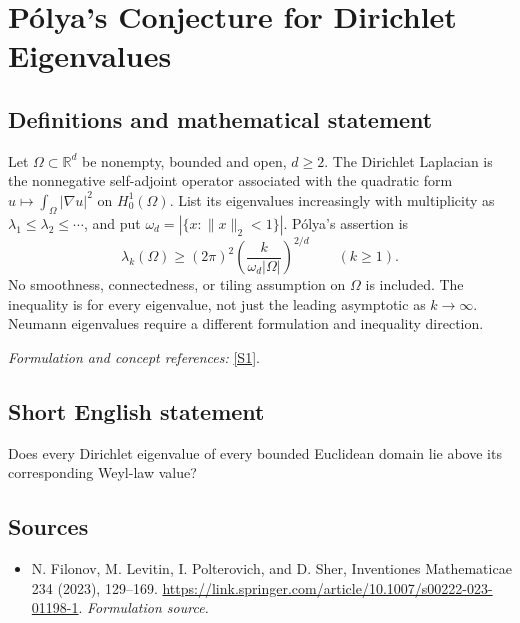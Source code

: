 \documentclass[11pt]{article}
\begin{document}
\section*{\texorpdfstring{Pólya's Conjecture for Dirichlet Eigenvalues}{Pólya's Conjecture for Dirichlet Eigenvalues}}\label{30006908}
\subsection{Definitions and mathematical statement}
Let $\Omega\subset{\mathbb{R}}^d$ be nonempty, bounded and open, $d\ge2$. The Dirichlet Laplacian is the nonnegative self-adjoint operator associated with the quadratic form $u\mapsto\int_\Omega|\nabla u|^2$ on $H_0^1(\Omega)$. List its eigenvalues increasingly with multiplicity as $\lambda_1\le\lambda_2\le\cdots$, and put $\omega_d=|\{x:\|x\|_2<1\}|$. P\'olya's assertion is
\[
 \lambda_k(\Omega)\ge(2\pi)^2
 \left(\frac{k}{\omega_d|\Omega|}\right)^{2/d}
 \qquad(k\ge1).
\]
No smoothness, connectedness, or tiling assumption on $\Omega$ is included. The inequality is for every eigenvalue, not just the leading asymptotic as $k\to\infty$. Neumann eigenvalues require a different formulation and inequality direction.
\par\smallskip\textit{Formulation and concept references:} \href{https://link.springer.com/article/10.1007/s00222-023-01198-1}{[S1]}.

\subsection{Short English statement}
Does every Dirichlet eigenvalue of every bounded Euclidean domain lie above its corresponding Weyl-law value?
\subsection{Sources}
\begin{itemize}
\item[S1]N. Filonov, M. Levitin, I. Polterovich, and D. Sher, Inventiones Mathematicae 234 (2023), 129–169.
\url{https://link.springer.com/article/10.1007/s00222-023-01198-1}.
\textit{Formulation source.}
\end{itemize}
\end{document}
